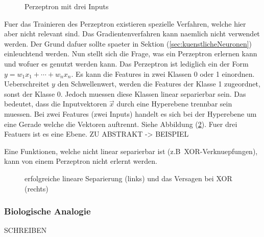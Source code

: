 \documentclass[../main]{subfiles}
\begin{document}
\begin{figure}[h!]
  \centering
  \caption{Perzeptron mit drei Inputs}
  \label{fi:perzeptron}
\end{figure}

Fuer das Trainieren des Perzeptron existieren spezielle Verfahren, welche hier
aber nicht relevant sind. Das Gradientenverfahren kann naemlich nicht verwendet
werden. Der Grund dafuer sollte spaeter in Sektion (\ref{sec:kuenstlicheNeuronen}) einleuchtend werden.
\para
Nun stellt sich die Frage, was ein Perzeptron erlernen kann und wofuer es genutzt werden kann.
Das Perzeptron ist lediglich ein  der Form
$y=w_1x_1+\cdots+w
_nx_n$.
Es kann die Features in zwei Klassen 0 oder 1 einordnen.
Ueberschreitet $y$ den Schwellenwert, werden die Features der Klasse 1 zugeordnet, sonst
der Klasse 0.
Jedoch muessen diese Klassen linear separierbar sein.
Das bedeutet, dass die Inputvektoren $\vec{x}$ durch eine Hyperebene trennbar
sein muessen.
Bei zwei Features (zwei Inputs) handelt es sich bei der Hyperebene um eine
Gerade welche die Vektoren auftrennt. Siehe Abbildung (\ref{fig:linearer_Klassifikator}).
Fuer drei Featuers ist es eine Ebene.
ZU ABSTRAKT -> BEISPIEL

Eine Funktionen, welche nicht linear separierbar ist (z.B\ XOR-Verknuepfungen),
kann von einem Perzeptron nicht erlernt werden.

\begin{figure}[h!]

  \caption{erfolgreiche lineare Separierung (links) und das Versagen bei XOR (rechts)}
  \label{fig:linearer_Klassifikator}
\end{figure}

\cite{wiki:perzeptron}

\subsubsection{Biologische Analogie}
SCHREIBEN
\end{document}
